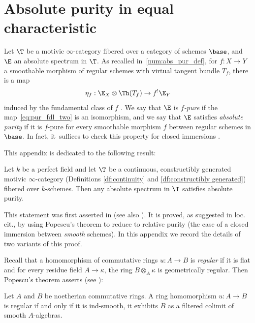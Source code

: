 \section{Absolute purity in equal characteristic}
\label{apd:popescu}

Let $\T$ be a motivic $\infty$-category fibered over a category of schemes $\base$, and $\E$ an absolute spectrum in $\T$.
As recalled in~\ref{num:abs_pur_def}, for $f:X\to Y$ a smoothable morphism of regular schemes with virtual tangent bundle $T_f$, there is a map
\begin{equation}
\label{eq:pur_fdl_two}
\eta_f:\E_X\otimes\Th(T_f)\to f^!\E_Y
\end{equation}
induced by the fundamental class of $f$ \cite[Def.\,4.3.7]{DJK}.
We say that $\E$ is \emph{$f$-pure} if the map~\eqref{eq:pur_fdl_two} is an isomorphism, and we say that $\E$ satisfies \emph{absolute purity} if it is $f$-pure for every smoothable morphism $f$ between regular schemes in $\base$.
In fact, it~suffices to check this property for closed immersions \cite[Rem.\,4.3.12(i)]{DJK}.

This appendix is dedicated to the following result:

\begin{thm}
\label{thm:abs_pur_eqchar}
Let $k$ be a perfect field and let $\T$ be a continuous, constructibly generated motivic $\infty$-category (Definitions \ref{df:continuity} and \ref{df:constructibly generated}) fibered over $k$-schemes.
Then any absolute spectrum in $\T$ satisfies absolute purity.
\end{thm}

This statement was first asserted in \cite[Ex.\,1.3.4(2)]{DegliseOrientation} (see also \cite[Prop.\,6.2]{CD5}).
It is proved, as suggested in loc.\,cit., by using Popescu's theorem to reduce to relative purity (the case of a closed immersion between \emph{smooth} schemes).
In this appendix we record the details of two variants of this proof.

Recall that a homomorphism of commutative rings $u:A\to B$ is \emph{regular} if it is flat and for every residue field $A \to \kappa$, the ring $B\otimes_A\kappa$ is geometrically regular. Then Popescu's theorem asserts (see \cite[Th.\,1.1]{Spivakovsky}):\enlargethispage{-\baselineskip}%

\begin{thm}[Popescu]
\label{thm:popescu}
Let $A$ and $B$ be noetherian commutative rings.
A ring homomorphism $u:A \to B$ is regular if and only if it is ind-smooth, \ie it exhibits $B$ as a filtered colimit of smooth $A$-algebras.
\end{thm}

